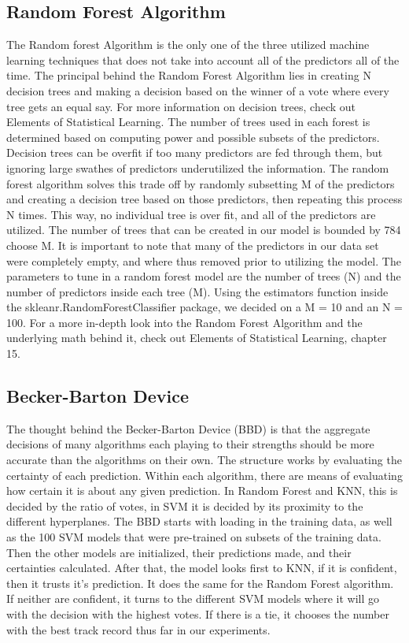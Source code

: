 \documentclass[11pt, oneside]{article}   	%
\begin{document}
\subsection{Random Forest Algorithm}
The Random forest Algorithm is the only one of the three utilized machine learning techniques that does not take into account all of the predictors all of the time. The principal behind the Random Forest Algorithm lies in creating N decision trees and making a decision based on the winner of a vote where every tree gets an equal say. For more information on decision trees, check out Elements of Statistical Learning. \cite{DecisionTree} The number of trees used in each forest is determined based on computing power and possible subsets of the predictors. Decision trees can be overfit if too many predictors are fed through them, but ignoring large swathes of predictors underutilized the information. The random forest algorithm solves this trade off by randomly subsetting M of the predictors and creating a decision tree based on those predictors, then repeating this process N times. This way, no individual tree is over fit, and all of the predictors are utilized. The number of trees that can be created in our model is bounded by 784 choose M.  It is important to note that many of the predictors in our data set were completely empty, and where thus removed prior to utilizing the model. The parameters to tune in a random forest model are the number of trees (N) and the number of predictors inside each tree (M). Using the estimators function inside the skleanr.RandomForestClassifier package, we decided on a M = 10 and an N = 100. For a more in-depth look into the Random Forest Algorithm and the underlying math behind it, check out Elements of Statistical Learning, chapter 15. \cite{RandomForestBook}
\subsection{Becker-Barton Device}
The thought behind the Becker-Barton Device (BBD) is that the aggregate decisions of many algorithms each playing to their strengths should be more accurate than the algorithms on their own. The structure works by evaluating the certainty of each prediction. Within each algorithm, there are means of evaluating how certain it is about any given prediction. In Random Forest and KNN, this is decided by the ratio of votes, in SVM it is decided by its proximity to the different hyperplanes. The BBD starts with loading in the training data, as well as the 100 SVM models that were pre-trained on subsets of the training data. Then the other models are initialized, their predictions made, and their certainties calculated. After that, the model looks first to KNN, if it is confident, then it trusts it's prediction. It does the same for the Random Forest algorithm. If neither are confident, it turns to the different SVM models where it will go with the decision with the highest votes. If there is a tie, it chooses the number with the best track record thus far in our experiments. 
\end{document}
